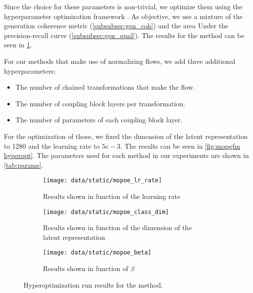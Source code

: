 Since the choice for these parameters is non-trivial, we optimize them using the hyperparameter optimization framework  \citep{akiba_optuna_2019}.
As objective, we use a mixture of the generation coherence metric (\cref{subsubsec:gen_coh}) and the area Under the precision-recall curve (\cref{subsubsec:gen_qual}).
The results for the  method can be seen in \cref{fig:mopoe hyperopt}.

For our methods that make use of normalizing flows, we add three additional hyperparameters:
\begin{itemize}
    \item The number of chained transformations that make the flow.
    \item The number of coupling block layers per transformation.
    \item The number of parameters of each coupling block layer.
\end{itemize}

For the optimization of those, we fixed the dimension of the latent representation to 1280 and the learning rate to $5e-3$.
The results can be seen in \cref{fig:mopgfm hyperopt}.
The parameters used for each method in our experiments are shown in \cref{tab:params}.



\begin{figure}
    \centering
    \begin{subfigure}[b]{0.49\textwidth}
        \centering
        \texttt{[image: data/static/mopoe\_lr\_rate]}
        \caption{Results shown in function of the learning rate}
    \end{subfigure}
    \hfill
    \begin{subfigure}[b]{0.49\textwidth}
        \centering
        \texttt{[image: data/static/mopoe\_class\_dim]}
        \caption{Results shown in function of the dimension of the latent representation}
    \end{subfigure}
    \hfill
    \begin{subfigure}[b]{0.5\textwidth}
        \centering
        \texttt{[image: data/static/mopoe\_beta]}
        \caption{Results shown in function of $\beta$}
    \end{subfigure}
    \caption{Hyperoptimization run results for the  method.}
    \label{fig:mopoe hyperopt}
\end{figure}

